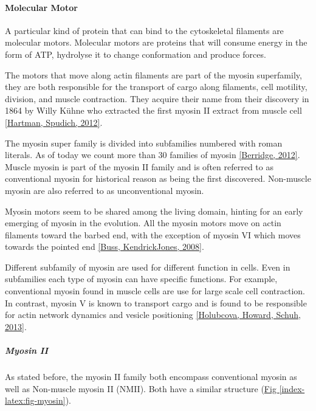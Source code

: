 \documentclass[A4paperpaper,11pt,english]{sphinxmanual}
\begin{document}
\paragraph{Molecular Motor}
\label{index-latex:molecular-motor}
A particular kind of protein that can bind to the cytoskeletal filaments are
molecular motors. Molecular motors are proteins that will consume energy
in the form of ATP, hydrolyse it to change conformation and produce forces.

The motors that move along actin filaments are part of the myosin superfamily, they
are both responsible for the transport of cargo along filaments, cell motility,
division, and muscle contraction. They acquire their name from their discovery
in 1864 by Willy Kühne who extracted the first myosin II extract from muscle
cell {\hyperref[index-latex:hartman2012]{{[}Hartman, Spudich,  2012{]}}}.

The myosin super family is divided into subfamilies numbered with roman literals.
As of today we count more than 30 families of myosin {\hyperref[index-latex:berridge2012a]{{[}Berridge,  2012{]}}}.
Muscle myosin is part of the myosin II family and is often referred to  as
conventional myosin for historical reason as being the first discovered.
Non-muscle  myosin are also referred to as unconventional myosin.

Myosin motors seem to be shared among the living domain, hinting for an
early emerging of myosin in the evolution. All the myosin motors move on actin
filaments toward the barbed end, with the exception of myosin VI which moves
towards the pointed end {\hyperref[index-latex:buss2008]{{[}Buss, KendrickJones,  2008{]}}}.

Different subfamily of myosin are used for different function in cells. Even in
subfamilies each type of myosin can have specific functions. For example,
conventional myosin found in muscle cells are use for large scale cell
contraction. In contrast, myosin V is known to transport cargo and is found to
be responsible for actin network dynamics and vesicle positioning
{\hyperref[index-latex:holubcova2013]{{[}Holubcova, Howard, Schuh,  2013{]}}}.


\subparagraph{Myosin II}
\label{index-latex:myosin-ii}\label{index-latex:myoii}
As stated before, the myosin II family both encompass conventional myosin as
well as Non-muscle myosin II (NMII). Both have a similar structure (\hyperref[index-latex:fig-myosin]{Fig  \ref*{index-latex:fig-myosin}}).
\end{document}
